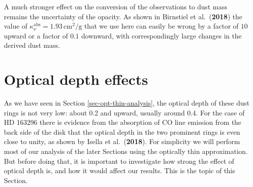 \documentclass{aa}
\def\paperdsharpisella{Isella et al.\ ({\bf 2018})}
\def\paperdsharpbirnstiel{Birnstiel et al.\ ({\bf 2018})}
\begin{document}
A much stronger effect on the conversion of the observations to dust mass
remains the uncertainty of the opacity. As shown in \paperdsharpbirnstiel{}
the value of $\kappa_\nu^{\mathrm{abs}}=1.93\,\mathrm{cm}^2/\mathrm{g}$ that
we use here can easily be wrong by a factor of $10$ upward or a factor of
$0.1$ downward, with correspondingly large changes in the derived dust mass.




\section{Optical depth effects}
\label{sec-optical-depth-effects}
%
As we have seen in Section \ref{sec-opt-thin-analysis}, the optical depth of
these dust rings is not very low: about 0.2 and upward, usually around 0.4. For
the case of HD 163296 there is evidence from the absorption of CO line emission
from the back side of the disk that the optical depth in the two prominent rings
is even close to unity, as shown by \paperdsharpisella{}. For simplicity we will
perform most of our analysis of the later Sections using the optically thin
approximation. But before doing that, it is important to investigate how strong
the effect of optical depth is, and how it would affect our results. This is the
topic of this Section.
\end{document}
